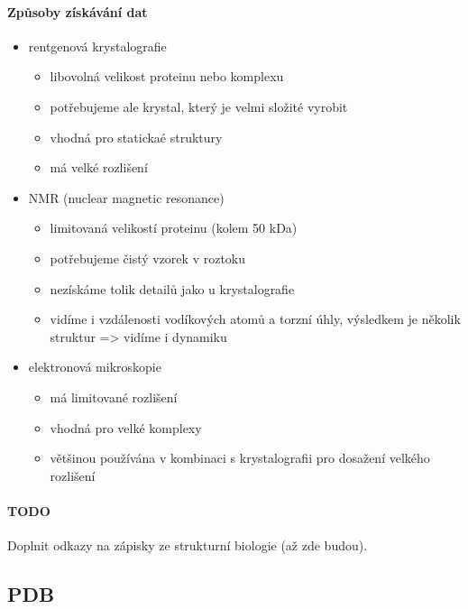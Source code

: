 \documentclass[DIV=8]{scrreprt}
\newcommand{\mybox}[2]{
    \paragraph{#1} #2
}
\begin{document}
\paragraph{Způsoby získávání dat}
\begin{itemize}[nosep]
    \item rentgenová krystalografie
\begin{itemize}[nosep]
    \item libovolná velikost proteinu nebo komplexu
    \item potřebujeme ale krystal, který je velmi složité vyrobit
    \item vhodná pro statickaé struktury
    \item má velké rozlišení
\end{itemize}

    \item NMR (nuclear magnetic resonance)
\begin{itemize}[nosep]
    \item limitovaná velikostí proteinu (kolem 50 kDa)
    \item potřebujeme čistý vzorek v roztoku
    \item nezískáme tolik detailů jako u krystalografie
    \item vidíme i vzdálenosti vodíkových atomů a torzní úhly, výsledkem je několik struktur => vidíme i dynamiku
\end{itemize}

    \item elektronová mikroskopie
\begin{itemize}[nosep]
    \item má limitované rozlišení
    \item vhodná pro velké komplexy
    \item většinou používána v kombinaci s krystalografii pro dosažení velkého rozlišení
\end{itemize}

\end{itemize}



\mybox{TODO}{Doplnit odkazy na zápisky ze strukturní biologie (až zde budou).}


\subsection{PDB} \label{PDB}
\end{document}
